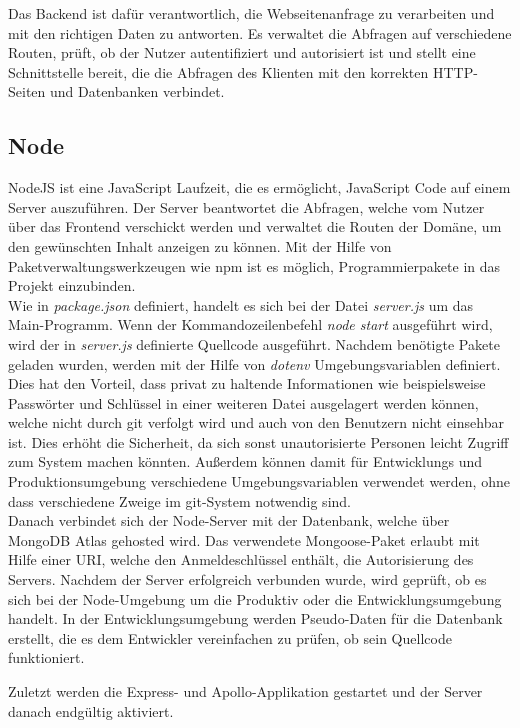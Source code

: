 Das Backend ist dafür verantwortlich, die Webseitenanfrage zu verarbeiten und mit den richtigen Daten zu antworten. Es verwaltet die Abfragen auf verschiedene Routen, prüft, ob der Nutzer autentifiziert und autorisiert ist und stellt eine Schnittstelle bereit, die die Abfragen des Klienten mit den korrekten HTTP-Seiten und Datenbanken verbindet.

\subsection{Node}
NodeJS ist eine JavaScript Laufzeit, die es ermöglicht, JavaScript Code auf einem Server auszuführen. Der Server beantwortet die Abfragen, welche vom Nutzer über das Frontend verschickt werden und verwaltet die Routen der Domäne, um den gewünschten Inhalt anzeigen zu können. Mit der Hilfe von Paketverwaltungswerkzeugen wie npm ist es möglich, Programmierpakete in das Projekt einzubinden.\\

Wie in \textit{package.json} definiert, handelt es sich bei der Datei \textit{server.js} um das Main-Programm. Wenn der Kommandozeilenbefehl \textit{node start} ausgeführt wird, wird der in \textit{server.js} definierte Quellcode ausgeführt.
Nachdem benötigte Pakete geladen wurden, werden mit der Hilfe von \textit{dotenv} Umgebungsvariablen definiert. Dies hat den Vorteil, dass privat zu haltende Informationen wie beispielsweise Passwörter und Schlüssel in einer weiteren Datei ausgelagert werden können, welche nicht durch git verfolgt wird und auch von den Benutzern nicht einsehbar ist. Dies erhöht die Sicherheit, da sich sonst unautorisierte Personen leicht Zugriff zum System machen könnten. Außerdem können damit für Entwicklungs und Produktionsumgebung verschiedene Umgebungsvariablen verwendet werden, ohne dass verschiedene Zweige im git-System notwendig sind.\\

Danach verbindet sich der Node-Server mit der Datenbank, welche über MongoDB Atlas gehosted wird. Das verwendete Mongoose-Paket erlaubt mit Hilfe einer URI, welche den Anmeldeschlüssel enthält, die Autorisierung des Servers. Nachdem der Server erfolgreich verbunden wurde, wird geprüft, ob es sich bei der Node-Umgebung um die Produktiv oder die Entwicklungsumgebung handelt. In der Entwicklungsumgebung werden Pseudo-Daten für die Datenbank erstellt, die es dem Entwickler vereinfachen zu prüfen, ob sein Quellcode funktioniert.

Zuletzt werden die Express- und Apollo-Applikation gestartet und der Server danach endgültig aktiviert.

